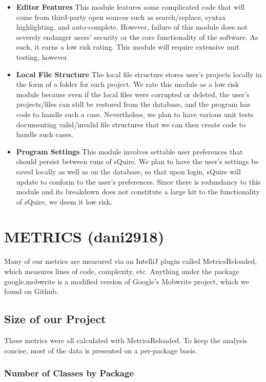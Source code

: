 \documentclass[twoside,letterpaper]{article}
\begin{document}
\begin{itemize}
	\item \textbf{Editor Features}
	This module features some complicated code that will come from third-party open sources such as search/replace, syntax highlighting, and auto-complete. However, failure of this module does not severely endanger users' security or the core functionality of the software. As such, it earns a low risk rating. This module will require extensive unit testing, however.
	\item \textbf{Local File Structure} 
	The local file structure stores user's projects locally in the form of a folder for each project. We rate this module as a low risk module because even if the local files were corrupted or deleted, the user's projects/files can still be restored from the database, and the program has code to handle such a case. Nevertheless, we plan to have various unit tests documenting valid/invalid file structures that we can then create code to handle such cases.
	\item \textbf{Program Settings} 
	This module involves settable user preferences that should persist between runs of sQuire. We plan to have the user's settings be saved locally as well as on the database, so that upon login, sQuire will update to conform to the user's preferences. Since there is redundancy to this module and its breakdown does not constitute a large hit to the functionality of sQuire, we deem it low risk.
\end{itemize}


\newpage
\section[METRICS (dani2918)]{\rmfamily\bfseries\color{black} METRICS (dani2918)}

Many of our metrics are measured via an IntelliJ plugin called MetricsReloaded, which measures lines of code, complexity, etc. Anything under the package google.mobwrite is a modified version of Google's Mobwrite project, which we found on Github.


	\subsection{Size of our Project} 
	
	These metrics were all calculated with MetricsReloaded. To keep the analysis concise, most of the data is presented on a per-package basis.
\subsubsection{ Number of Classes by Package }
\end{document}

